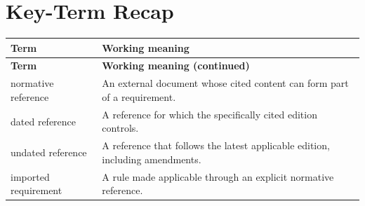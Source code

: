 \documentclass[11pt,letterpaper]{article}
\begin{document}
\section{Key-Term Recap}
\begin{longtable}{@{}>{\RaggedRight\arraybackslash}p{}>{\RaggedRight\arraybackslash}p{}@{}}\toprule\textbf{Term} & \textbf{Working meaning}\\\midrule\endfirsthead\toprule\textbf{Term} & \textbf{Working meaning (continued)}\\\midrule\endhead\bottomrule\endfoot
normative reference & An external document whose cited content can form part of a requirement.\\
dated reference & A reference for which the specifically cited edition controls.\\
undated reference & A reference that follows the latest applicable edition, including amendments.\\
imported requirement & A rule made applicable through an explicit normative reference.\\
\end{longtable}
\end{document}
